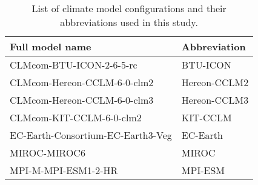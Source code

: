 \begin{table}[htbp]
  \centering
  \caption{List of climate model configurations and their abbreviations used in this study.}
  \label{tab:model_abbrevs}
  \begin{tabular}{p{8cm}l}
    \toprule
    Full model name & Abbreviation \\
    \midrule
    CLMcom-BTU-ICON-2-6-5-rc & BTU-ICON \\
    CLMcom-Hereon-CCLM-6-0-clm2 & Hereon-CCLM2 \\
    CLMcom-Hereon-CCLM-6-0-clm3 & Hereon-CCLM3 \\
    CLMcom-KIT-CCLM-6-0-clm2 & KIT-CCLM \\
    EC-Earth-Consortium-EC-Earth3-Veg & EC-Earth \\
    MIROC-MIROC6 & MIROC \\
    MPI-M-MPI-ESM1-2-HR & MPI-ESM \\
    \bottomrule
  \end{tabular}
\end{table}
